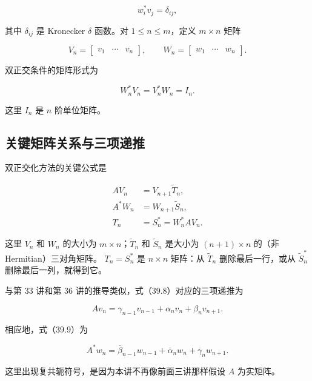 \documentclass[UTF8,fontset=none,12pt]{ctexart}
\begin{document}
\begin{equation}
w_i^*v_j=\delta_{ij},
\tag{39.6}
\end{equation}

其中 $\delta_{ij}$ 是 Kronecker $\delta$ 函数。对 $1\leq n\leq m$，定义
$m\times n$ 矩阵

\begin{equation}
V_n=\begin{bmatrix}v_1&\cdots&v_n\end{bmatrix},
\qquad
W_n=\begin{bmatrix}w_1&\cdots&w_n\end{bmatrix}.
\tag{39.7}
\end{equation}

双正交条件的矩阵形式为

\[
W_n^*V_n=V_n^*W_n=I_n.
\]

这里 $I_n$ 是 $n$ 阶单位矩阵。

\subsection*{关键矩阵关系与三项递推}

双正交化方法的关键公式是

\begin{align}
AV_n&=V_{n+1}\widetilde T_n, \tag{39.8}\\
A^*W_n&=W_{n+1}\widetilde S_n, \tag{39.9}\\
T_n&=S_n^*=W_n^*AV_n. \tag{39.10}
\end{align}

这里 $V_n$ 和 $W_n$ 的大小为 $m\times n$；$\widetilde T_n$ 和
$\widetilde S_n$ 是大小为 $(n+1)\times n$ 的（非 Hermitian）三对角矩阵。
$T_n=S_n^*$ 是 $n\times n$ 矩阵：从 $\widetilde T_n$ 删除最后一行，或从
$\widetilde S_n^*$ 删除最后一列，就得到它。

与第 33 讲和第 36 讲的推导类似，式（39.8）对应的三项递推为

\begin{equation}
Av_n=\gamma_{n-1}v_{n-1}+\alpha_nv_n+\beta_nv_{n+1}.
\tag{39.11}
\end{equation}

相应地，式（39.9）为

\begin{equation}
A^*w_n=\overline{\beta}_{n-1}w_{n-1}
+\overline{\alpha}_nw_n
+\overline{\gamma}_nw_{n+1}.
\tag{39.12}
\end{equation}

这里出现复共轭符号，是因为本讲不再像前面三讲那样假设 $A$ 为实矩阵。
\end{document}
